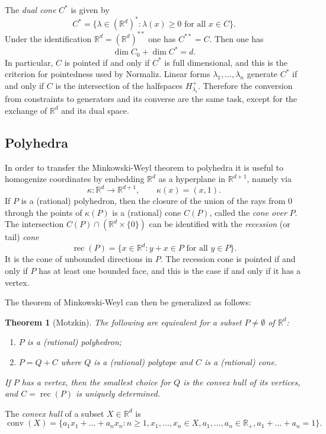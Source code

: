\documentclass[12pt,a4paper]{scrartcl}
\newtheorem{theorem}{Theorem}
\theoremstyle{definition}
\def\RR{{\mathbb R}}
\DeclareMathOperator{\conv}{conv}
\DeclareMathOperator{\rec}{rec}
\begin{document}
The \emph{dual cone} $C^*$ is given by
$$
C^*=\{\lambda\in (\RR^d)^*:\lambda(x)\ge0 \text{ for all } x\in C\}.
$$
Under the identification $\RR^d=(\RR^d)^{**}$ one has $C^{**}=C$. Then one has
$$
\dim C_0+\dim C^*=d.
$$
In particular, $C$ is pointed if and only if $C^*$ is full dimensional, and this is the criterion for pointedness used by Normaliz. Linear forms $\lambda_1,\dots,\lambda_n$ generate $C^*$ if and only if $C$ is the intersection of the halfspaces $H_{\lambda_i}^+$. Therefore the conversion from constraints to generators and its converse are the same task, except for the exchange of $\RR^d$ and its dual space.

\subsection{Polyhedra}

In order to transfer the Minkowski-Weyl theorem to polyhedra it is useful to homogenize coordinates by embedding $\RR^d$ as a hyperplane in $\RR^{d+1}$, namely via
$$
\kappa:\RR^d\to\RR^{d+1},\qquad \kappa(x)=(x,1).
$$
If $P$ is a (rational) polyhedron, then the closure of the union of the rays from $0$ through the points of $\kappa(P)$ is a (rational) cone $C(P)$, called the \emph{cone over} $P$. The intersection $C(P)\cap(\RR^d\times\{0\})$ can be identified with the \emph{recession} (or tail) \emph{cone}
$$
\rec(P)=\{x\in\RR^d: y+x\in P\text{ for all } y\in P\}.
$$
It is the cone of unbounded directions in $P$. The recession cone is pointed if and only if $P$ has at least one bounded face, and this is the case if and only if it has a vertex.

The theorem of Minkowski-Weyl can then be generalized as follows:

\begin{theorem}[Motzkin]
	The following are equivalent for a subset $P\neq\emptyset$  of $\RR^d$:
	\begin{enumerate}
		\item $P$ is a (rational) polyhedron;
		\item $P=Q+C$ where $Q$ is a (rational) polytope and $C$ is a (rational) cone.
	\end{enumerate}
	If $P$ has a vertex, then the smallest choice for $Q$ is the convex hull of its vertices, and $C=\rec(P)$ is uniquely determined.
\end{theorem}

The \emph{convex hull} of a subset $X\in\RR^d$ is
$$
\conv(X)=\{a_1x_1+\dots+a_nx_n: n\ge 1, x_1,\dots,x_n\in X, a_1,\dots,a_n\in\RR_+, a_1+\dots+a_n=1\}.
$$
\end{document}
